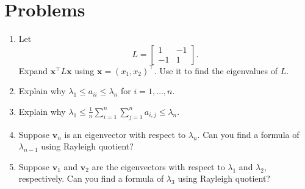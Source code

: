 \documentclass{article}
\newcommand{\trans}{^\top}
\newcommand{\bx}{\mathbf{x}}
\newcommand{\bv}{\mathbf{v}}
\theoremstyle{definition}
\begin{document}
\section*{Problems}
\begin{enumerate}
\setlength\itemsep{2em}
\item Let 
\[L = \begin{bmatrix}
 1 & -1 \\
 -1 & 1
\end{bmatrix}.\]
Expand $\bx\trans L\bx$ using $\bx = (x_1, x_2)\trans$.  Use it to find the eigenvalues of $L$.
\item Explain why $\lambda_1 \leq a_{ii} \leq \lambda_n$ for $i = 1, \ldots, n$.
\item Explain why $\lambda_1 \leq \frac{1}{n}\sum_{i=1}^n\sum_{j=1}^n a_{i,j} \leq \lambda_n$.
\item Suppose $\bv_n$ is an eigenvector with respect to $\lambda_n$.  Can you find a formula of $\lambda_{n-1}$ using Rayleigh quotient?
\item Suppose $\bv_1$ and $\bv_2$ are the eigenvectors with respect to $\lambda_1$ and $\lambda_2$, respectively.  Can you find a formula of $\lambda_3$ using Rayleigh quotient?
\end{enumerate}

\end{document}
